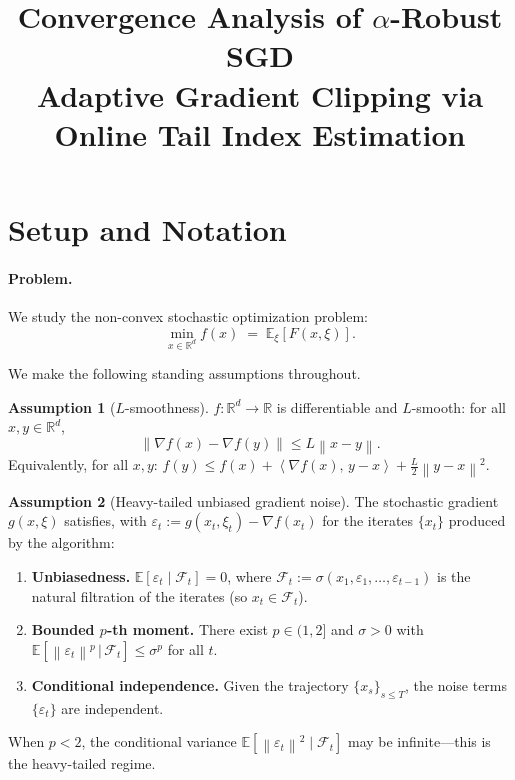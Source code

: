 \documentclass[11pt]{article}
\title{\textbf{Convergence Analysis of $\alpha$-Robust SGD\\[4pt]
\large Adaptive Gradient Clipping via Online Tail Index Estimation}}
\author{}
\date{}
\theoremstyle{definition}
\newtheorem{assumption}{Assumption}
\newcommand{\E}{\mathbb{E}}
\newcommand{\R}{\mathbb{R}}
\newcommand{\norm}[1]{\left\| #1 \right\|}
\newcommand{\inner}[2]{\left\langle #1,\, #2 \right\rangle}
\newcommand{\Filt}{\mathcal{F}}
\begin{document}
\maketitle
\tableofcontents
\newpage

\section{Setup and Notation}
\label{sec:setup}

\paragraph{Problem.} We study the non-convex stochastic optimization problem:
\[
  \min_{x \in \R^d} f(x) \;=\; \E_\xi[F(x, \xi)].
\]

We make the following standing assumptions throughout.

\begin{assumption}[$L$-smoothness]\label{ass:smooth}
$f \colon \R^d \to \R$ is differentiable and $L$-smooth: for all $x, y \in \R^d$,
\[
  \norm{\nabla f(x) - \nabla f(y)} \leq L\norm{x - y}.
\]
Equivalently, for all $x, y$:
$f(y) \leq f(x) + \inner{\nabla f(x)}{y - x} + \frac{L}{2}\norm{y - x}^2$.
\end{assumption}

\begin{assumption}[Heavy-tailed unbiased gradient noise]\label{ass:heavy}
The stochastic gradient $g(x, \xi)$ satisfies, with
$\varepsilon_t := g(x_t, \xi_t) - \nabla f(x_t)$ for the iterates $\{x_t\}$
produced by the algorithm:
\begin{enumerate}[label=(\alph*),noitemsep,leftmargin=*]
  \item \textbf{Unbiasedness.} $\E[\varepsilon_t \mid \Filt_t] = 0$, where
    $\Filt_t := \sigma(x_1, \varepsilon_1, \ldots, \varepsilon_{t-1})$ is the
    natural filtration of the iterates (so $x_t \in \Filt_t$).
  \item \textbf{Bounded $p$-th moment.} There exist $p \in (1, 2]$ and
    $\sigma > 0$ with
    $\E\!\left[\norm{\varepsilon_t}^p \,\big|\, \Filt_t\right] \leq \sigma^p$
    for all $t$.
  \item \textbf{Conditional independence.} Given the trajectory
    $\{x_s\}_{s \leq T}$, the noise terms $\{\varepsilon_t\}$ are independent.
\end{enumerate}
When $p < 2$, the conditional variance $\E[\norm{\varepsilon_t}^2 \mid \Filt_t]$
may be infinite---this is the heavy-tailed regime.
\end{assumption}
\end{document}
